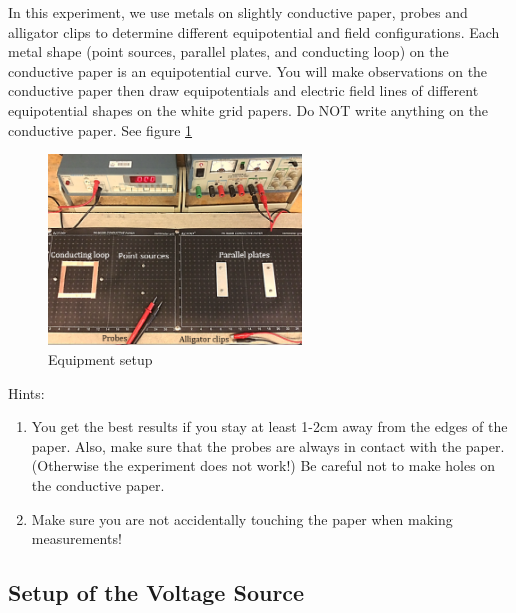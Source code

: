In this experiment, we use metals on slightly conductive paper, probes and alligator clips  to determine different equipotential and field configurations. Each metal shape (point sources, parallel plates, and conducting loop) on the conductive paper is an equipotential curve. You will make observations on the conductive paper then draw equipotentials and electric field lines of different equipotential shapes on the white grid papers. Do NOT write anything on the conductive paper. See figure \ref{fig:equip_setup}   
\begin{figure}[h]
    \begin{center}
        \includegraphics[width=0.6\textwidth]{./Exp1/pic/Picture1.png}
    \end{center}
    \caption{Equipment setup}
    \label{fig:equip_setup}
\end{figure}

\myskip
\noindent Hints:

    \begin{enumerate}
        \item You get the best results if you stay at least 1-2cm away from the edges of the paper. Also, make sure that the probes are always in contact with the paper. (Otherwise the experiment does not work!) Be careful not to make holes on the conductive paper.
        \item Make sure you are not accidentally touching the paper when making measurements!
    \end{enumerate}

\subsection{Setup of the Voltage Source}

